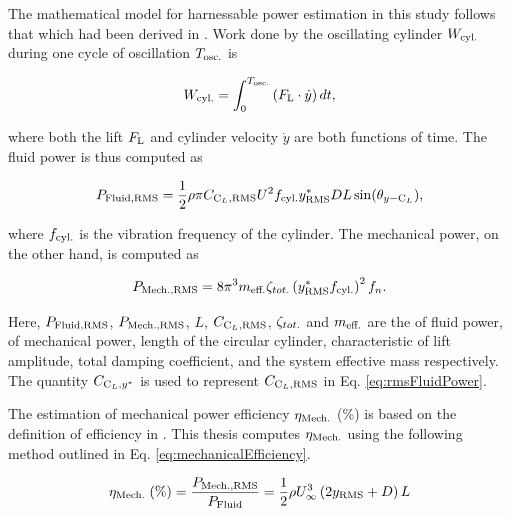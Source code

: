 \documentclass[oneside]{utmthesis}
\begin{document}
\vspace{\baselineskip}

The mathematical model for harnessable power estimation in this study follows that which had been derived in \citet{Raghavan2007a}. Work done by the oscillating cylinder $W_{\text{cyl.}}$ during one cycle of oscillation $T_{\text{osc.}}$ is

\begin{equation}
  W_{\text{cyl.}} = \int_{0}^{T_{\text{osc.}}} \left ( F_{\text{L}} \cdot \dot{y} \right ) dt,
  \label{eq:workCylinder}
\end{equation}

\noindent where both the lift $F_{\text{L}}$ and cylinder velocity $\dot{y}$ are both functions of time. The fluid power is thus computed as

\begin{equation}
  P_{\text{Fluid,RMS}} = \frac{1}{2} \rho \pi C_{\text{C}_{L},\text{RMS}} U^{2} f_{\text{cyl.}} y^{*}_{\text{RMS}} D L \sin(\theta_{y-\text{C}_{L}}),
  \label{eq:rmsFluidPower}
\end{equation}

\noindent where $f_{\text{cyl.}}$ is the vibration frequency of the cylinder. The mechanical power, on the other hand, is computed as

\begin{equation}
  P_{\text{Mech.,RMS}} = 8 \pi^{3} m_{\text{eff.}} \zeta_{tot.} \left (y^{*}_{\text{RMS}} f_{\text{cyl.}} \right )^{2} f_{n}.
  \label{eq:rmsMechPower}
\end{equation}

Here, $P_{\text{Fluid,RMS}}$, $P_{\text{Mech.,RMS}}$, $L$, $C_{\text{C}_{L},\text{RMS}}$, $\zeta_{tot.}$ and $m_{\text{eff.}}$ are the \rms{} of fluid power, \rms{} of mechanical power, length of the circular cylinder, characteristic \rms{} of lift amplitude, total damping coefficient, and the system effective mass respectively. The quantity $C_{\text{C}_{L},y^{*}}$ is used to represent $C_{\text{C}_{L},\text{RMS}}$ in Eq. \ref{eq:rmsFluidPower}.

The estimation of mechanical power efficiency $\eta_{\text{Mech.}}$ (\%) is based on the definition of efficiency in \citet{Sun2018}. This thesis computes $\eta_{\text{Mech.}}$ using the following method outlined in Eq. \ref{eq:mechanicalEfficiency}.

\begin{equation}
  \eta_{\text{Mech.}} \;(\%) = \frac{P_{\text{Mech.,RMS}}}{P_{\text{Fluid}}} = \frac{1}{2}\rho U^{3}_{\infty} \left( 2 y_{\text{RMS}} + D \right) L
  \label{eq:mechanicalEfficiency}
\end{equation}
\end{document}
